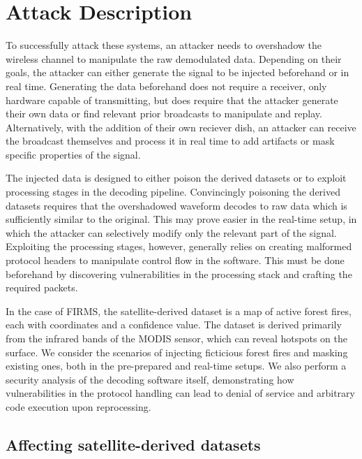 \section{Attack Description}\label{sec:attack}

To successfully attack these systems, an attacker needs to overshadow the wireless channel to manipulate the raw demodulated data.
Depending on their goals, the attacker can either generate the signal to be injected beforehand or in real time.
Generating the data beforehand does not require a receiver, only hardware capable of transmitting, but does require that the attacker generate their own data or find relevant prior broadcasts to manipulate and replay.
Alternatively, with the addition of their own reciever dish, an attacker can receive the broadcast themselves and process it in real time to add artifacts or mask specific properties of the signal.

The injected data is designed to either poison the derived datasets or to exploit processing stages in the decoding pipeline.
Convincingly poisoning the derived datasets requires that the overshadowed waveform decodes to raw data which is sufficiently similar to the original.
This may prove easier in the real-time setup, in which the attacker can selectively modify only the relevant part of the signal.
Exploiting the processing stages, however, generally relies on creating malformed protocol headers to manipulate control flow in the software.
This must be done beforehand by discovering vulnerabilities in the processing stack and crafting the required packets.

In the case of FIRMS, the satellite-derived dataset is a map of active forest fires, each with coordinates and a confidence value.
The dataset is derived primarily from the infrared bands of the MODIS sensor, which can reveal hotspots on the surface.
We consider the scenarios of injecting ficticious forest fires and masking existing ones, both in the pre-prepared and real-time setups.
We also perform a security analysis of the decoding software itself, demonstrating how vulnerabilities in the protocol handling can lead to denial of service and arbitrary code execution upon reprocessing.

\subsection{Affecting satellite-derived datasets}

